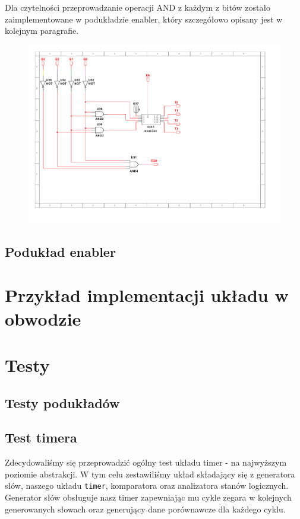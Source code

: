 \documentclass[a4paper]{article}
\begin{document}
Dla czytelności przeprowadzanie operacji AND z każdym z bitów zostało zaimplementowane w podukładzie enabler,
 który szczegółowo opisany jest w kolejnym paragrafie.


\begin{figure}[H]
    \centering
    \includegraphics[width=\textwidth]{timer_driver.pdf}
\end{figure}

\pagebreak
\subsection{Podukład enabler}


\section{Przykład implementacji układu w obwodzie}

\pagebreak
\section{Testy}
\subsection{Testy podukładów}
\subsection{Test timera}
Zdecydowaliśmy się przeprowadzić ogólny test układu timer - na najwyższym poziomie abstrakcji.
W tym celu zestawiliśmy układ składający się z generatora słów, naszego układu \verb|timer|, komparatora oraz analizatora
stanów logicznych. Generator słów obsługuje nasz timer zapewniając mu cykle zegara w kolejnych 
generowanych słowach oraz generujący dane porównawcze dla każdego cyklu.
\end{document}
